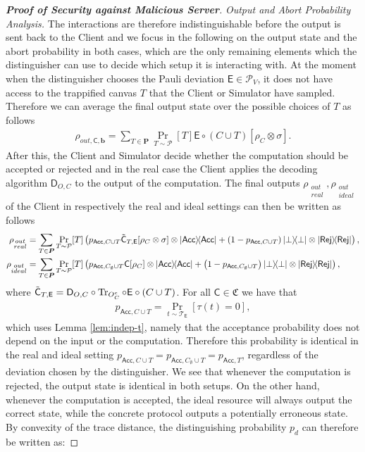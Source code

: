 \documentclass[12pt]{iopart}
\newcommand{\cptp}[1]{\mathsf{#1}} \newcommand{\pd}[1]{\mathcal{#1}}  \newcommand{\sch}[1]{\bm{#1}}
\renewcommand{\1}{\mathds{1}}
\newcommand{\acc}{\mathsf{Acc}}
\newcommand{\rej}{\mathsf{Rej}}
\newcommand{\TP}{C\cup T}
\newcommand{\Deco}{\cptp D_{O, C}}
\newcommand{\Cdev}[1]{\tilde{\cptp C}_{T, #1}}
\begin{document}
\begin{proof}[\bf Proof of Security against Malicious Server]
\textit{Output and Abort Probability Analysis.}
The interactions are therefore indistinguishable before the output is sent back to the Client and we focus in the following on the output state and the abort probability in both cases, which are the only remaining elements which the distinguisher can use to decide which setup it is interacting with. 
At the moment when the distinguisher chooses the Pauli deviation $\cptp E \in \mathcal P_V$, it does not have access to the trappified canvas $T$ that the Client or Simulator have sampled. Therefore we can average the final output state over the possible choices of $T$ as follows
\begin{align}
\rho_{out, \cptp C, \bm{b}} = \sum_{T \in \sch P} \Pr_{T \sim \pd P}[T] \cptp E \circ (\TP)[\rho_C \otimes \sigma].
\end{align}
After this, the Client and Simulator decide whether the computation should be accepted or rejected and in the real case the Client applies the decoding algorithm $\Deco$ to the output of the computation. The final outputs $\rho_{\substack{out\\ real}}, \rho_{\substack{out\\ ideal}}$ of the Client in respectively the real and ideal settings can then be written as follows
\begin{align}
\rho_{\substack{out\\ real}} &= \sum_{T \in \sch P}\Pr_{T \sim \pd P}[T] \left(p_{\acc, \TP}\Cdev{\cptp E} [\rho_C \otimes \sigma]\otimes\dyad{\acc} + \left(1 - p_{\acc, \TP}\right)\dyad{\bot}\otimes\dyad{\rej}\right),\\
\rho_{\substack{out\\ ideal}} &= \sum_{T \in \sch P}\Pr_{T \sim \pd P}[T] \left(p_{\acc, C_\emptyset \cup T}\cptp C [\rho_C]\otimes\dyad{\acc} + \left(1 - p_{\acc, C_\emptyset \cup T}\right)\dyad{\bot}\otimes\dyad{\rej}\right),
\end{align}
where $\Cdev{\cptp E} = \Deco\circ\Tr_{O_C^c}\circ\cptp E\circ (\TP)$. For all $\cptp C \in \mathfrak{C}$ we have that
\begin{align}
p_{\acc, \TP} = \Pr_{t\sim \pd T_{\cptp E}}[\tau(t) = 0],
\end{align}
which uses Lemma \ref{lem:indep-t}, namely that the acceptance probability does not depend on the input or the computation. Therefore this probability is identical in the real and ideal setting $p_{\acc, \TP} = p_{\acc, C_\emptyset \cup T} = p_{\acc, T}$, regardless of the deviation chosen by the distinguisher. We see that whenever the computation is rejected, the output state is identical in both setups. On the other hand, whenever the computation is accepted, the ideal resource will always output the correct state, while the concrete protocol outputs a potentially erroneous state. By convexity of the trace distance, the distinguishing probability $p_d$ can therefore be written as:

\end{proof}
\end{document}
